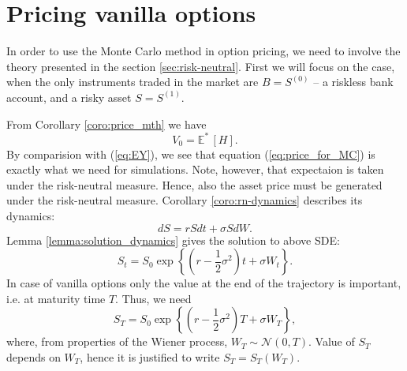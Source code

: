 \documentclass[a4paper,12pt, oneside]{book}
\theoremstyle{definition}
\theoremstyle{remark}
\def\Em{{\mathbb{E}^*}\,}
\begin{document}
\section{Pricing vanilla options}
\label{sec:pricing_vanilla}

In order to use the Monte Carlo method in option pricing, we need to involve the theory presented in the section \ref{sec:risk-neutral}. First we will focus on the case, when the only instruments traded in the market are $B = S^{(0)}$ -- a riskless bank account, and a risky asset $S = S^{(1)}$.

From Corollary \ref{coro:price_mth} we have
\begin{equation}
 \label{eq:price_for_MC}
 V_0 = \Em[H].%
\end{equation}
By comparision with (\ref{eq:EY}), we see that equation (\ref{eq:price_for_MC}) is exactly what we need for simulations. Note, however, that expectaion is taken under the risk-neutral measure. Hence, also the asset price must be generated under the risk-neutral measure. Corollary \ref{coro:rn-dynamics} describes its dynamics:
\[ dS = rSdt + \sigma S dW. \]
Lemma \ref{lemma:solution_dynamics} gives the solution to above SDE:
\begin{equation}
 \label{eq:vanilla_St}
 S_t = S_0 \exp\left\{ (r - \frac{1}{2}\sigma^2)t + \sigma W_t \right\}.
\end{equation}
In case of vanilla options only the value at the end of the trajectory is important, i.e. at maturity time $T$. Thus, we need
\begin{equation}
\label{eq:vanilla_ST}
 S_T = S_0 \exp\left\{ (r - \frac{1}{2}\sigma^2)T + \sigma W_T \right\},
\end{equation}
where, from properties of the Wiener process, $W_T \sim \mathcal{N}(0,T)$. Value of $S_T$ depends on $W_T$, hence it is justified to write $S_T = S_T(W_T)$.
\end{document}
